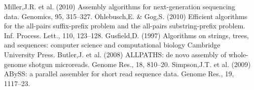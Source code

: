 \documentclass[conference]{IEEEtran}
\begin{document}
\begin{thebibliography}{00}
 Miller,J.R. et al. (2010) Assembly algorithms for next-generation sequencing data.
Genomics, 95, 315–327.
 Ohlebusch,E. \& Gog,S. (2010) Efficient algorithms for the all-pairs suffix-prefix problem and the all-pairs substring-prefix problem. Inf. Process. Lett., 110, 123–128.
 Gusfield,D. (1997) Algorithms on strings, trees, and sequences: computer science and
computational biology Cambridge University Press.
 Butler,J. et al. (2008) ALLPATHS: de novo assembly of whole-genome shotgun
microreads. Genome Res., 18, 810–20.
 Simpson,J.T. et al. (2009) ABySS: a parallel assembler for short read sequence data.
Genome Res., 19, 1117–23.

\end{thebibliography}
\end{document}
